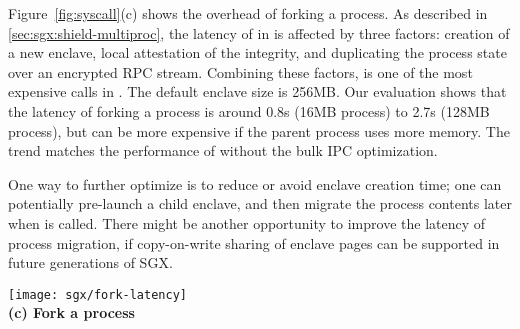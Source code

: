 Figure~\ref{fig:syscall}(c) shows the overhead of forking a process.
As described in \ref{sec:sgx:shield-multiproc}, the latency of  in \graphenesgx{} is affected by three factors:
creation of a new enclave, local attestation of the integrity, and duplicating the process state over an encrypted RPC stream.
Combining these factors,  is one of the most expensive calls in \graphenesgx{}.
The default enclave size is 256MB.
Our evaluation shows that the latency of forking a process is around 0.8s (16MB process) to 2.7s (128MB process), but can be more expensive if the parent process uses more memory.
The trend matches the performance of \graphene{} without the bulk IPC optimization.

One way to further optimize  is to reduce or avoid enclave creation time; one can potentially pre-launch a child enclave, and then migrate the process contents later when  is called.
There might be another opportunity to improve the latency of process migration,
if copy-on-write sharing of enclave pages can be supported in future generations of SGX.








\begin{figure*}[t!]
\centering
\begin{minipage}{.45\textwidth}
\centering
\footnotesize
\vspace{6pt}
\texttt{[image: sgx/fork-latency]}\\
\vspace{3pt}
{\bf (c) Fork a process}
\vspace{6pt}
\end{minipage}
\caption{Latency of some expensive system calls in \graphenesgx{}, including opening and reading a secured (authenticated) file, and forking a new process. The results are compared with native Linux and \graphene{}.}
\label{fig:sgx-shield-fork}
\end{figure*}

